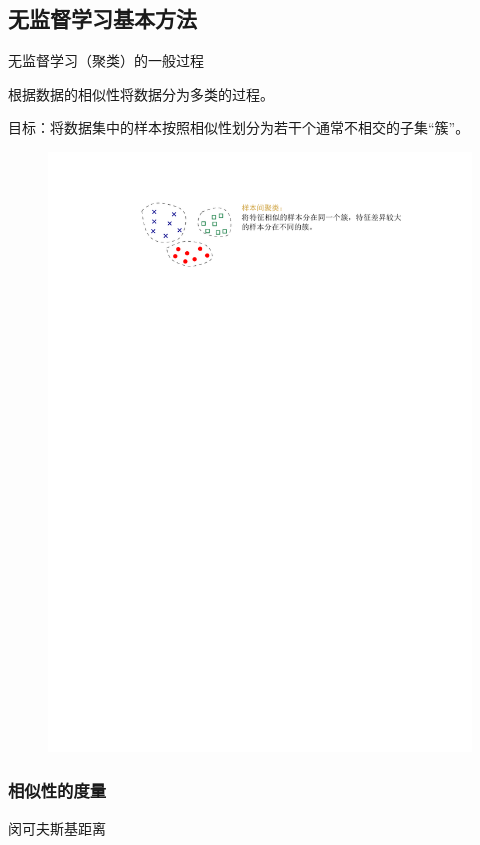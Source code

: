 \subsection{无监督学习基本方法}
\textcolor{main1}{无监督学习（聚类）的一般过程}
\begin{definition}[无监督学习]
    根据数据的相似性将数据分为多类的过程。
\end{definition}
\textcolor{main1}{目标}：将数据集中的样本按照相似性划分为若干个通常不相交的子集“簇”。
\begin{figure}[htbp]
    \centering
    \includegraphics{image/聚类目标.pdf}
\end{figure}
\subsubsection{相似性的度量}
\textcolor{main1}{闵可夫斯基距离}

